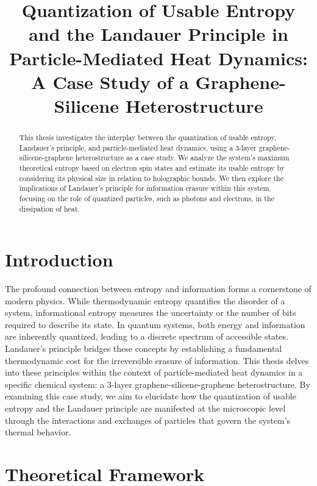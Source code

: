 	
	\title{Quantization of Usable Entropy and the Landauer Principle in Particle-Mediated Heat Dynamics: A Case Study of a Graphene-Silicene Heterostructure}
	\author{}
	\date{}
	
	\begin{abstract}
		This thesis investigates the interplay between the quantization of usable entropy, Landauer's principle, and particle-mediated heat dynamics, using a 3-layer graphene-silicene-graphene heterostructure as a case study. We analyze the system's maximum theoretical entropy based on electron spin states and estimate its usable entropy by considering its physical size in relation to holographic bounds. We then explore the implications of Landauer's principle for information erasure within this system, focusing on the role of quantized particles, such as photons and electrons, in the dissipation of heat.
	\end{abstract}
	
	\section{Introduction}
	The profound connection between entropy and information forms a cornerstone of modern physics. While thermodynamic entropy quantifies the disorder of a system, informational entropy measures the uncertainty or the number of bits required to describe its state. In quantum systems, both energy and information are inherently quantized, leading to a discrete spectrum of accessible states. Landauer's principle bridges these concepts by establishing a fundamental thermodynamic cost for the irreversible erasure of information. This thesis delves into these principles within the context of particle-mediated heat dynamics in a specific chemical system: a 3-layer graphene-silicene-graphene heterostructure. By examining this case study, we aim to elucidate how the quantization of usable entropy and the Landauer principle are manifested at the microscopic level through the interactions and exchanges of particles that govern the system's thermal behavior.
	
	\section{Theoretical Framework}
	
